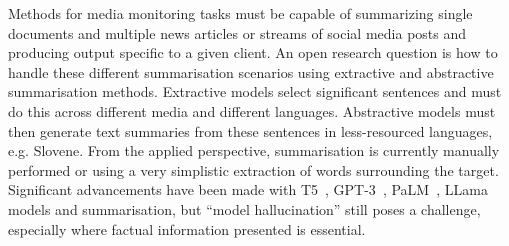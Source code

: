 Methods for media monitoring tasks must be capable of summarizing single documents and multiple news articles or streams of social media posts and producing output specific to a given client. 
An open research question is how to handle these different summarisation scenarios using extractive and abstractive summarisation methods. 
Extractive models select significant sentences and must do this across different media and different languages.
Abstractive models must then generate text summaries from these sentences in less-resourced languages, e.g. Slovene. 
From the applied perspective, summarisation is currently manually performed or using a very simplistic extraction of words surrounding the target.
Significant advancements have been made with T5~\parencite{raffel2020exploring}, GPT-3~\parencite{brown2020language}, PaLM~\parencite{chowdhery2022palm}, LLama~\parencite{touvron2023llama} models and summarisation, but ``model hallucination'' still poses a challenge, especially where factual information presented is essential.
\renewcommand{\arraystretch}{1.3}

